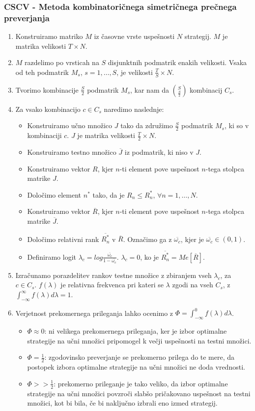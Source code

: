 \documentclass{beamer}
\begin{document}
\begin{frame}[allowframebreaks,t]
\frametitle{CSCV - Metoda kombinatoričnega simetričnega prečnega preverjanja}
\begin{enumerate}
\item	Konstruiramo matriko $M$ iz časovne vrste uspešnosti $N$ strategij. $M$ je matrika velikosti $T\times N$. 
\item	$M$ razdelimo po vrsticah na $S$ disjunktnih podmatrik enakih velikosti. Vsaka od teh podmatrik $M_s$, $s=1,\dots,S$, je velikosti $\frac{T}{S} \times N$.
\item	Tvorimo kombinacije $\frac{S}{2}$ podmatrik $M_s$, kar nam da ${S \choose \frac{S}{2}}$ kombinacij $C_s$. 
\item	Za vsako kombinacijo $c \in C_s$ naredimo naslednje:
\begin{itemize}
\item	Konstruiramo učno množico $J$ tako da združimo $\frac{S}{2}$ podmatrik $M_s$, ki so v kombinaciji $c$. $J$ je matrika velikosti $\frac{T}{2} \times N$.
\item	Konstruiramo testno množico $\overline{J}$ iz podmatrik, ki niso v $J$.
\item	Konstruiramo vektor $R$, kjer $n$-ti element pove uspešnost $n$-tega stolpca matrike $J$.
\item	Določimo element $n^*$ tako, da je $R_n \leq R_n^*$, $\forall n = 1,\dots,N$.
\item	Konstruiramo vektor $\overline{R}$, kjer $n$-ti element pove uspešnost $n$-tega stolpca matrike $\overline{J}$.
\item	Določimo relativni rank $\overline{R_n^*}$ v $\overline{R}$. Označimo ga z $\overline{\omega_c}$, kjer je $\overline{\omega_c} \in (0,1)$. 
\item	Definiramo logit $\lambda_c = log\frac{\overline{\omega_c}}{1-\overline{\omega_c}}$. $\lambda_c = 0$, ko je $\overline{R_n^*} = Me[\overline{R}]$.
\end{itemize}
\item	Izračunamo porazdelitev rankov testne množice z zbiranjem vseh $\lambda_c$, za $c \in C_s$. $f(\lambda)$ je relativna frekvenca pri kateri se $\lambda$ zgodi na vseh $C_s$, z $\int_{-\infty}^{\infty} f(\lambda)d\lambda = 1$.
\item Verjetnost prekomernega prileganja lahko ocenimo z $\Phi = \int_{-\infty}^{0}f(\lambda)d\lambda$.
\begin{itemize}
\item $\Phi \approx 0$: ni velikega prekomernega prileganja, ker je izbor optimalne strategije na učni množici pripomogel k večji uspešnosti na testni množici.
\item $\Phi = \frac{1}{2}$: zgodovinsko preverjanje se prekomerno prilega do te mere, da postopek izbora optimalne strategije na učni množici ne doda vrednosti.
\item $\Phi >> \frac{1}{2}$: prekomerno prileganje je tako veliko, da izbor optimalne strategije na učni množici povzroči slabšo pričakovano uspešnost na testni množici, kot bi bila, če bi naključno izbrali eno izmed strategij.
\end{itemize}
\end{enumerate}
\end{frame}
\end{document}
